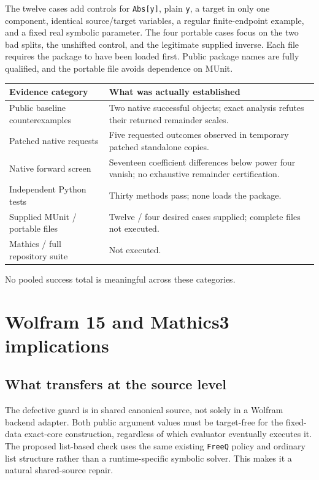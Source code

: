 \documentclass[11pt,letterpaper]{article}
\theoremstyle{remark}\newtheorem{remark}[theorem]{Remark}
\newcommand{\code}[1]{\texttt{#1}}
\begin{document}
The twelve cases add controls for \code{Abs[y]}, plain \code{y}, a target in
only one component, identical source/target variables, a regular finite-endpoint
example, and a fixed real symbolic parameter. The four portable cases focus on
the two bad splits, the unshifted control, and the legitimate supplied inverse.
Each file requires the package to have been loaded first. Public package names
are fully qualified, and the portable file avoids dependence on MUnit.

\begin{center}
\begin{tabularx}{\textwidth}{@{}p{}Y@{}}
\toprule
Evidence category & What was actually established\\
\midrule
Public baseline counterexamples & Two native successful objects; exact analysis
refutes their returned remainder scales.\\
Patched native requests & Five requested outcomes observed in temporary patched
standalone copies.\\
Native forward screen & Seventeen coefficient differences below power four
vanish; no exhaustive remainder certification.\\
Independent Python tests & Thirty methods pass; none loads the package.\\
Supplied MUnit / portable files & Twelve / four desired cases supplied;
complete files not executed.\\
Mathics / full repository suite & Not executed.\\
\bottomrule
\end{tabularx}
\end{center}
No pooled success total is meaningful across these categories.

\section{Wolfram 15 and Mathics3 implications}
\subsection{What transfers at the source level}
The defective guard is in shared canonical source, not solely in a Wolfram
backend adapter. Both public argument values must be target-free for the
fixed-data exact-core construction, regardless of which evaluator eventually
executes it. The proposed list-based check uses the same existing
\code{FreeQ} policy and ordinary list structure rather than a runtime-specific
symbolic solver. This makes it a natural shared-source repair.
\end{document}
